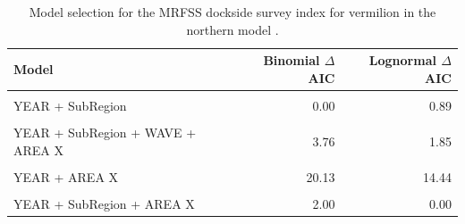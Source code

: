 \documentclass[
  english,
  a4paper,
]{article}
\begin{document}
\begin{table}

\caption{\label{tab:tab-model-select-mrfss}Model selection for the MRFSS dockside survey index for vermilion in the northern model .}
\centering
\begin{tabular}[t]{lrr}
\toprule
Model & Binomial $\Delta$AIC & Lognormal $\Delta$AIC\\
\midrule
\cellcolor{gray!6}{1} & \cellcolor{gray!6}{65.99} & \cellcolor{gray!6}{106.17}\\
YEAR + SubRegion & 0.00 & 0.89\\
\cellcolor{gray!6}{YEAR + SubRegion + WAVE} & \cellcolor{gray!6}{1.77} & \cellcolor{gray!6}{3.03}\\
YEAR + SubRegion + WAVE + AREA X & 3.76 & 1.85\\
\cellcolor{gray!6}{YEAR + WAVE} & \cellcolor{gray!6}{22.05} & \cellcolor{gray!6}{21.16}\\
\addlinespace
YEAR + AREA X & 20.13 & 14.44\\
\cellcolor{gray!6}{YEAR + WAVE + AREA X} & \cellcolor{gray!6}{22.67} & \cellcolor{gray!6}{16.13}\\
YEAR + SubRegion + AREA X & 2.00 & 0.00\\
\bottomrule
\end{tabular}
\end{table}

\FloatBarrier
\end{document}
